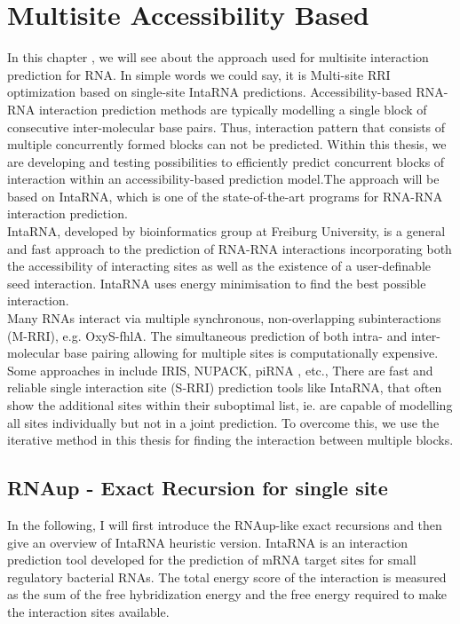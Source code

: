 \documentclass[twoside,a4paper]{report}
\begin{document}
		
		
		
	\chapter{Multisite Accessibility Based  }
	
	In this chapter , we will see about the approach used for multisite interaction prediction for RNA. In simple words we could say, it is Multi-site RRI optimization based on single-site IntaRNA predictions. Accessibility-based RNA-RNA interaction prediction methods are typically modelling a single block of consecutive inter-molecular base pairs. Thus, interaction pattern that consists of multiple concurrently formed blocks can not be predicted. Within this thesis, we are developing and testing possibilities to efficiently predict concurrent blocks of interaction within an accessibility-based prediction model.The approach will be based on IntaRNA, which is one of the state-of-the-art programs for RNA-RNA interaction prediction.\\
	
	IntaRNA, developed by \citep{busch2008intarna} bioinformatics group at Freiburg University, is a general and fast approach to the prediction of RNA-RNA interactions incorporating both the accessibility of interacting sites as well as the existence of a user-definable seed interaction.  IntaRNA uses energy minimisation to find the best possible interaction.  \\
	
	Many RNAs interact via multiple synchronous, non-overlapping subinteractions (M-RRI), e.g. OxyS-fhlA. The simultaneous prediction of both intra- and inter-molecular base pairing allowing for multiple sites is computationally expensive. Some approaches in include IRIS, NUPACK, piRNA , etc., There are fast and reliable single interaction site (S-RRI) prediction tools like IntaRNA, that often show the additional sites within their suboptimal list, ie. are capable of modelling all sites individually but not in a joint prediction.	To overcome this, we use the iterative method in this thesis for finding the interaction between multiple blocks. \\
	
	\section{RNAup - Exact Recursion for single site}
	
	In the following, I will first introduce the RNAup-like exact recursions and then give an overview of IntaRNA heuristic version. IntaRNA is an interaction prediction tool developed for the prediction of mRNA target sites for small regulatory bacterial RNAs. The total energy score of the interaction is measured as the sum of the free hybridization energy and the free energy required to make the interaction sites available.\\
	
\end{document}
